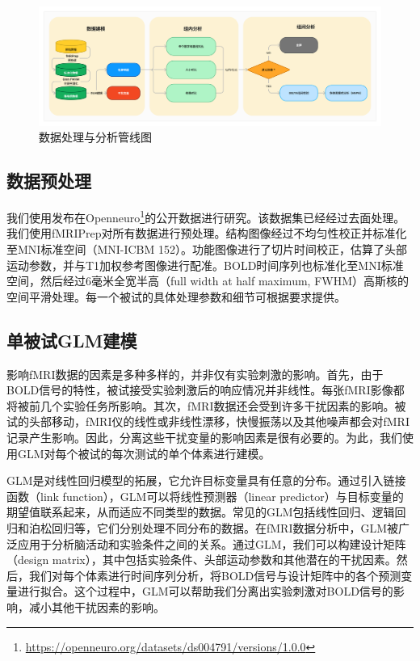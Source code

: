\documentclass[bachelor, comfort]{shtthesis}
\begin{document}
\begin{figure}[ht]
	\centering
	\includegraphics[width=1.0\linewidth]{figures/pipeline.png}
	\caption{\label{fig:pipeline} 数据处理与分析管线图 }
\end{figure}


\subsection{数据预处理}
我们使用发布在Openneuro\footnote{\url{https://openneuro.org/datasets/ds004791/versions/1.0.0}}的公开数据进行研究。该数据集已经经过去面处理。我们使用fMRIPrep\cite{num2}对所有数据进行预处理。结构图像经过不均匀性校正并标准化至MNI标准空间（MNI-ICBM 152）。功能图像进行了切片时间校正，估算了头部运动参数，并与T1加权参考图像进行配准。BOLD时间序列也标准化至MNI标准空间，然后经过6毫米全宽半高（full width at half maximum, FWHM）高斯核的空间平滑处理。每一个被试的具体处理参数和细节可根据要求提供。

\subsection{单被试GLM建模}
影响fMRI数据的因素是多种多样的，并非仅有实验刺激的影响。首先，由于BOLD信号的特性，被试接受实验刺激后的响应情况并非线性。每张fMRI影像都将被前几个实验任务所影响。其次，fMRI数据还会受到许多干扰因素的影响。被试的头部移动，fMRI仪的线性或非线性漂移，快慢振荡以及其他噪声都会对fMRI记录产生影响。因此，分离这些干扰变量的影响因素是很有必要的。为此，我们使用GLM对每个被试的每次测试的单个体素进行建模。

GLM是对线性回归模型的拓展，它允许目标变量具有任意的分布。通过引入链接函数（link function），GLM可以将线性预测器（linear predictor）与目标变量的期望值联系起来，从而适应不同类型的数据。常见的GLM包括线性回归、逻辑回归和泊松回归等，它们分别处理不同分布的数据。在fMRI数据分析中，GLM被广泛应用于分析脑活动和实验条件之间的关系。通过GLM，我们可以构建设计矩阵（design matrix），其中包括实验条件、头部运动参数和其他潜在的干扰因素。然后，我们对每个体素进行时间序列分析，将BOLD信号与设计矩阵中的各个预测变量进行拟合。这个过程中，GLM可以帮助我们分离出实验刺激对BOLD信号的影响，减小其他干扰因素的影响。
\end{document}
